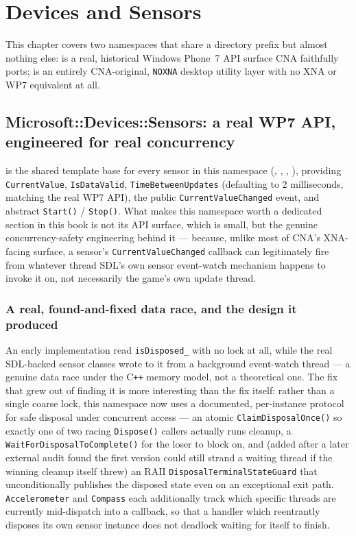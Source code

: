 \chapter{Devices and Sensors}
\label{ch:devices-sensors}

This chapter covers two namespaces that share a directory prefix but almost nothing else:
 is a real, historical Windows Phone~7 API surface CNA
faithfully ports;  is an entirely CNA-original, \texttt{NOXNA} desktop
utility layer with no XNA or WP7 equivalent at all.

\section{Microsoft::Devices::Sensors: a real WP7 API, engineered for real concurrency}

 is the shared template base for every sensor in this
namespace (, , ,
), providing \texttt{CurrentValue}, \texttt{IsDataValid},
\texttt{TimeBetweenUpdates} (defaulting to 2 milliseconds, matching the real WP7 API), the
public \texttt{CurrentValueChanged} event, and abstract \texttt{Start()} / \texttt{Stop()}.
What makes this namespace worth a dedicated section in this book is not its API surface,
which is small, but the genuine concurrency-safety engineering behind it --- because, unlike
most of CNA's XNA-facing surface, a sensor's \texttt{CurrentValueChanged} callback can
legitimately fire from whatever thread SDL's own sensor event-watch mechanism happens to
invoke it on, not necessarily the game's own update thread.

\subsection{A real, found-and-fixed data race, and the design it produced}

An early implementation read \texttt{isDisposed\_} with no lock at all, while the real
SDL-backed sensor classes wrote to it from a background event-watch thread --- a genuine
data race under the C\texttt{++} memory model, not a theoretical one. The fix that grew out
of finding it is more interesting than the fix itself: rather than a single coarse lock, this
namespace now uses a documented, per-instance protocol for safe disposal under concurrent
access --- an atomic \texttt{ClaimDisposalOnce()} so exactly one of two racing
\texttt{Dispose()} callers actually runs cleanup, a \texttt{WaitForDisposalToComplete()} for
the loser to block on, and (added after a later external audit found the first version could
still strand a waiting thread if the winning cleanup itself threw) an RAII
\texttt{DisposalTerminalStateGuard} that unconditionally publishes the disposed state even on
an exceptional exit path. \texttt{Accelerometer} and \texttt{Compass} each additionally track
which specific threads are currently mid-dispatch into a callback, so that a handler which
reentrantly disposes its own sensor instance does not deadlock waiting for itself to finish.

